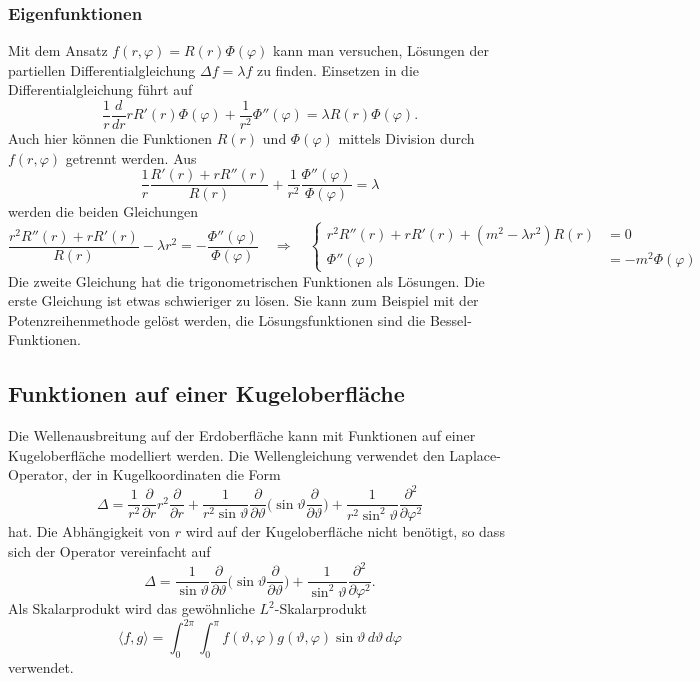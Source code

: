 \subsubsection{Eigenfunktionen}
Mit dem Ansatz $f(r,\varphi) = R(r) \Phi(\varphi)$ kann man versuchen,
Lösungen der partiellen Differentialgleichung $\Delta f=\lambda f$
zu finden.
Einsetzen in die Differentialgleichung führt auf
\[
\frac1r \frac{d}{dr} rR'(r) \Phi(\varphi)
+
\frac1{r^2} \Phi''(\varphi)
=
\lambda R(r)\Phi(\varphi).
\]
Auch hier können die Funktionen $R(r)$ und $\Phi(\varphi)$ mittels
Division durch $f(r,\varphi)$ getrennt werden.
Aus
\[
\frac1r \frac{R'(r) + rR''(r)}{R(r)}
+
\frac{1}{r^2}\frac{\Phi''(\varphi)}{\Phi(\varphi)}
=
\lambda
\]
werden die beiden Gleichungen
\[
\frac{r^2R''(r) + rR'(r)}{R(r)}
-
\lambda r^2
=
-\frac{\Phi''(\varphi)}{\Phi(\varphi)}
\quad\Rightarrow\quad
\left\{
\begin{aligned}
r^2R''(r) + rR'(r) +(m^2 - \lambda r^2)R(r) &= 0
\\
\Phi''(\varphi)&=-m^2 \Phi(\varphi)
\end{aligned}
\right.
\]
Die zweite Gleichung hat die trigonometrischen Funktionen
als Lösungen.
Die erste Gleichung ist etwas schwieriger zu lösen.
Sie kann zum Beispiel mit der Potenzreihenmethode gelöst werden, die
Lösungsfunktionen sind die Bessel-Funktionen.

%
%
\subsection{Funktionen auf einer Kugeloberfläche}
Die Wellenausbreitung auf der Erdoberfläche kann mit Funktionen
auf einer Kugeloberfläche modelliert werden.
Die Wellengleichung verwendet den Laplace-Operator, der in Kugelkoordinaten
die Form
\begin{equation}
\Delta
=
\frac{1}{r^2}
\frac{\partial}{\partial r}
r^2
\frac{\partial}{\partial r}
+
\frac{1}{r^2\sin\vartheta}
\frac{\partial}{\partial\vartheta}
\biggl(\sin\vartheta\frac{\partial}{\partial\vartheta}\biggr)
+
\frac{1}{r^2\sin^2\vartheta}
\frac{\partial^2}{\partial\varphi^2}
\label{buch:orthofkt:pde:laplacekugel}
\end{equation}
hat.
Die Abhängigkeit von $r$ wird auf der Kugeloberfläche nicht benötigt,
so dass sich der Operator vereinfacht auf
\[
\Delta
=
\frac{1}{\sin\vartheta}
\frac{\partial}{\partial\vartheta}
\biggl(\sin\vartheta\frac{\partial}{\partial\vartheta}\biggr)
+
\frac{1}{\sin^2\vartheta}
\frac{\partial^2}{\partial\varphi^2}.
\]
Als Skalarprodukt wird das gewöhnliche $L^2$-Skalarprodukt
\[
\langle f,g\rangle
=
\int_{0}^{2\pi}
\int_0^\pi
f(\vartheta,\varphi)
g(\vartheta,\varphi)
\sin \vartheta
\,d\vartheta
\,d\varphi
\]
verwendet.

